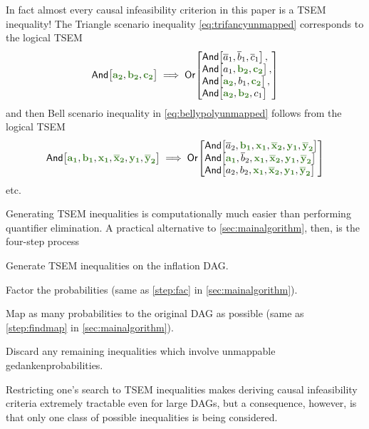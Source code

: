 {In fact almost every causal infeasibility criterion in this paper is a TSEM inequality! The Triangle scenario inequality \cref{eq:trifancyunmapped} corresponds to the logical TSEM
\begin{align}
    \NamedFunction{And}{\mgreen{a_2} , \mgreen{b_2} , \mgreen{c_2}}\implies 
\NamedFunction{Or}{\NamedFunction{And}{\n{a}_1 , \n{b}_1 , \n{c}_1},\\ \NamedFunction{And}{a_1 , \mgreen{b_2} , \mgreen{c_2}},\\ \NamedFunction{And}{\mgreen{a_2} , b_1 , \mgreen{c_2}},\\ \NamedFunction{And}{\mgreen{a_2} , \mgreen{b_2} , c_1}}
\end{align}
and then Bell scenario inequality in \cref{eq:bellypolyunmapped} follows from the logical TSEM
\begin{align}
 \NamedFunction{And}{\mgreen{a_1} , \mgreen{b_1} , \mgreen{x_1} , \mgreen{\n{x}_2}, \mgreen{y_1} ,  \mgreen{\n{y}_2}}
\implies
\NamedFunction{Or}{\NamedFunction{And}{\n{a}_2 , \mgreen{b_1} , \mgreen{x_1}, \mgreen{\n{x}_2} , \mgreen{y_1} , \mgreen{\n{y}_2}}\\
\NamedFunction{And}{\mgreen{a_1} , \n{b}_2 , \mgreen{x_1} ,\mgreen{\n{x}_2},\mgreen{y_1},\mgreen{\n{y}_2}}\\
\NamedFunction{And}{a_2 , b_2 , \mgreen{x_1}, \mgreen{\n{x}_2}, \mgreen{y_1}, \mgreen{\n{y}_2}}}
\end{align}
etc.

Generating TSEM inequalities is computationally much easier than performing quantifier elimination. A practical alternative to \cref{sec:mainalgorithm}, then, is the four-step process
\begin{compactenum}
\item Generate TSEM inequalities on the inflation DAG.
\item Factor the probabilities (same as \cref{step:fac} in \cref{sec:mainalgorithm}).
\item Map as many probabilities to the original DAG as possible (same as \cref{step:findmap} in \cref{sec:mainalgorithm}).
\item Discard any remaining inequalities which involve unmappable gedankenprobabilities.
\end{compactenum}
Restricting one's search to TSEM inequalities makes deriving causal infeasibility criteria extremely tractable even for large DAGs, but a consequence, however, is that only one class of possible inequalities is being considered.

}

